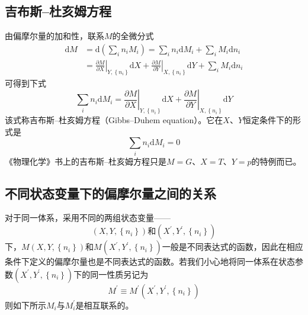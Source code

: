 \documentclass[main.tex]{subfiles}
\begin{document}
\subsection{吉布斯--杜亥姆方程}
由偏摩尔量的加和性，联系$M$的全微分式
\begin{align*}
    \mathrm{d}M & =\mathrm{d}\left(\sum_in_iM_i\right)=\sum_in_i\mathrm{d}M_i+\sum_iM_i\mathrm{d}n_i                                                                                                \\
                & =\left.\frac{\partial M}{\partial X}\right|_{Y,\left\{n_i\right\}}\mathrm{d}X+\left.\frac{\partial M}{\partial Y}\right|_{X,\left\{n_i\right\}}\mathrm{d}Y+\sum_iM_i\mathrm{d}n_i
\end{align*}
可得到下式
\begin{equation}\label{eq:II.2_Gibbs_Duhem_eq}
    \sum_in_i\mathrm{d}M_i=\left.\frac{\partial M}{\partial X}\right|_{Y,\left\{n_i\right\}}\mathrm{d}X+\left.\frac{\partial M}{\partial Y}\right|_{X,\left\{n_i\right\}}\mathrm{d}Y
\end{equation}
该式称吉布斯--杜亥姆方程（Gibbs--Duhem equation）。它在$X$、$Y$恒定条件下的形式是
\begin{equation}\label{eq:II.2_Gibbs_Duhem_eq_XYConst}
    \sum_in_i\mathrm{d}M_i=0
\end{equation}
《物理化学》书上的吉布斯--杜亥姆方程只是$M=G$、$X=T$、$Y=p$的特例而已。

\subsection{不同状态变量下的偏摩尔量之间的关系}
对于同一体系，采用不同的两组状态变量——
\[\left(X,Y,\left\{n_i\right\}\right)\text{和}\left(X^\prime,Y^\prime,\left\{n_i\right\}\right)\]
下，$M\left(X,Y,\left\{n_i\right\}\right)$和$M\left(X^\prime, Y^\prime,\left\{n_i\right\}\right)$一般是不同表达式的函数，因此在相应条件下定义的偏摩尔量也是不同表达式的函数。若我们小心地将同一体系在状态参数$\left(X^\prime,Y^\prime,\left\{n_i\right\}\right)$下的同一性质另记为
\[M^\prime\equiv M^\prime\left(X^\prime,Y^\prime,\left\{n_i\right\}\right)\]
则如下所示$M_i$与$M_i^\prime$是相互联系的。
\end{document}
